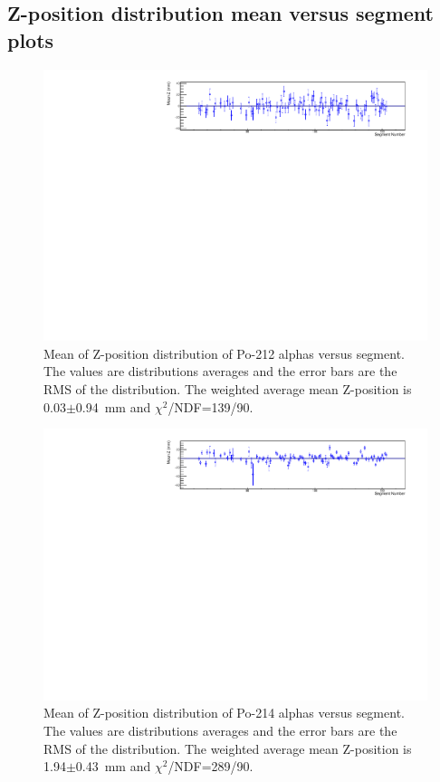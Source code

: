 \subsection{Z-position distribution mean versus segment plots}
\begin{figure}[!h]
	\centering
	\includegraphics[width=1.05\textwidth]{figures/PubBiPo212meanZvsCell.pdf}
	\caption{\label{fig:meanZvsCell212}Mean of Z-position distribution of Po-212 alphas versus segment. The values are distributions averages and the error bars are the RMS of the distribution. The weighted average mean Z-position is 0.03$\pm$0.94~mm and $\chi^2$/NDF=139/90.   }
\end{figure}
\begin{figure}[!h]
	\centering
	\includegraphics[width=1.05\textwidth]{figures/PubBiPo214meanZvsCell.pdf}
	\caption{\label{fig:meanZvsCell214}Mean of Z-position distribution of Po-214 alphas versus segment. The values are distributions averages and the error bars are the RMS of the distribution. The weighted average mean Z-position is 1.94$\pm$0.43~mm and $\chi^2$/NDF=289/90.}
\end{figure}
\clearpage
\newpage

